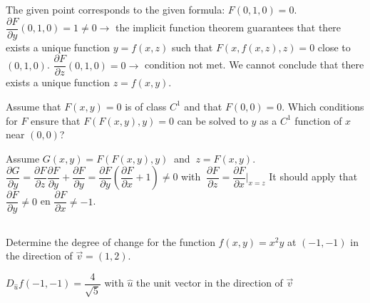 \begin{Answer}
        \Question The given point corresponds to the given formula: $F(0,1,0) = 0$.
        \Question $\dfrac{\partial F}{ \partial y}(0,1,0) = 1 \neq 0 \rightarrow$ the implicit function theorem guarantees that there exists a unique function $y=f(x,z)$ such that $F(x,f(x,z),z)=0$ close to $(0,1,0)$. 
        \Question $\dfrac{\partial F}{ \partial z}(0,1,0) =  0 \rightarrow$ condition not met. We cannot conclude that there exists a unique function $z=f(x,y)$.
\end{Answer}

\begin{Exercise}[difficulty = 3] Assume that $F(x,y)=0$ is of class $C^1$ and that $F(0,0)=0$. Which conditions for $F$ ensure that $F(F(x,y),y)=0$ can be solved to $y$ as a $C^1$ function of $x$ near $(0,0)$?
\end{Exercise}

\begin{Answer}
        \Question Assume $G(x,y) = F(F(x,y),y)\ $ and $\ z=F(x,y)$.
        \Question $\dfrac{\partial G}{ \partial y} = \dfrac{\partial F}{ \partial z}\dfrac{\partial F}{ \partial y} + \dfrac{\partial F}{ \partial y} = \dfrac{\partial F}{ \partial y} \left(\dfrac{\partial F}{ \partial x} + 1 \right) \neq 0$ \quad with $\ \dfrac{\partial F}{ \partial z} = \dfrac{\partial F}{ \partial x}  \biggl|_{x=z}$
        \Question It should apply that $ \dfrac{\partial F}{ \partial y} \neq 0$ en $\dfrac{\partial F}{ \partial x}  \neq -1$. 
\end{Answer}
\fi



\subsection*{}

\begin{Exercise}[difficulty = 1] Determine the degree of change for the function $f(x,y) = x^2y$  at $(-1,-1)$ in the direction of $\vec v = (1,2)$.
\end{Exercise}

\begin{Answer}
    $D_{\hat u} f(-1,-1) = \dfrac{4}{\sqrt{5}}$ with $\hat u$ the unit vector in the direction of $\vec v$
\end{Answer}

